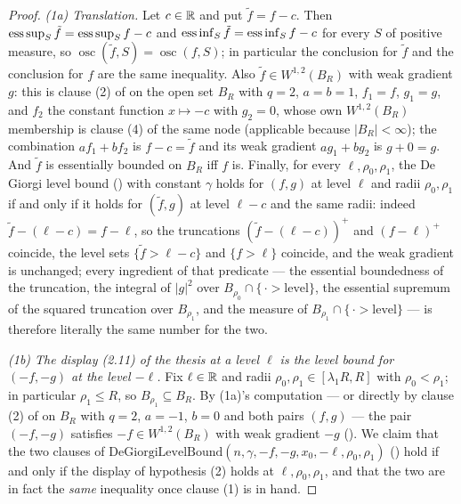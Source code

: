 \begin{proof}
\emph{(1a) Translation.}  Let $c\in\mathbb{R}$ and put $\tilde f=f-c$.  Then
$\operatorname*{ess\,sup}_S\tilde f=\operatorname*{ess\,sup}_Sf-c$ and $\operatorname*{ess\,inf}_S\tilde f=\operatorname*{ess\,inf}_Sf-c$ for every
$S$ of positive measure, so $\operatorname*{osc}(\tilde f,S)=\operatorname*{osc}(f,S)$;
in particular the conclusion for $\tilde f$ and the conclusion for $f$ are the
same inequality.  Also $\tilde f\in W^{1,2}(B_R)$ with weak gradient $g$: this is
clause (2) of  on the open set $B_R$ with $q=2$,
$a=b=1$, $f_1=f$, $g_1=g$, and $f_2$ the constant function $x\mapsto-c$ with
$g_2=0$, whose own $W^{1,2}(B_R)$ membership is clause (4) of the same node
(applicable because $|B_R|<\infty$); the combination $af_1+bf_2$ is $f-c=\tilde f$
and its weak gradient $ag_1+bg_2$ is $g+0=g$.  And $\tilde f$
is essentially bounded on $B_R$ iff $f$ is.  Finally, for every
$\ell,\rho_0,\rho_1$, the De Giorgi level bound
() with constant $\gamma$ holds for $(f,g)$ at level
$\ell$ and radii $\rho_0,\rho_1$ if and only if it holds for $(\tilde f,g)$ at
level $\ell-c$ and the same radii: indeed
$\tilde f-(\ell-c)=f-\ell$, so the truncations $(\tilde f-(\ell-c))^+$ and
$(f-\ell)^+$ coincide, the level sets
$\{\tilde f>\ell-c\}$ and $\{f>\ell\}$ coincide, and the weak gradient is
unchanged; every ingredient of that predicate --- the essential boundedness of
the truncation, the integral of $|g|^2$ over
$B_{\rho_0}\cap\{\,\cdot>\text{level}\}$, the essential supremum of the squared
truncation over $B_{\rho_1}$, and the measure of
$B_{\rho_1}\cap\{\,\cdot>\text{level}\}$ --- is therefore literally the same
number for the two.

\emph{(1b) The display (2.11) of the thesis at a level $\ell$ is the level bound for
$(-f,-g)$ at the level $-\ell$.}  Fix $\ell\in\mathbb{R}$ and radii
$\rho_0,\rho_1\in[\lambda_1R,R]$ with $\rho_0<\rho_1$; in particular
$\rho_1\le R$, so $B_{\rho_1}\subseteq B_R$.  By (1a)'s computation --- or
directly by clause (2) of  on $B_R$ with $q=2$,
$a=-1$, $b=0$ and both pairs $(f,g)$ --- the pair $(-f,-g)$ satisfies
$-f\in W^{1,2}(B_R)$ with weak gradient $-g$ ().  We claim
that the two clauses of
$\mathrm{DeGiorgiLevelBound}(n,\gamma,-f,-g,x_0,-\ell,\rho_0,\rho_1)$
() hold if and only if the display of hypothesis (2)
holds at $\ell,\rho_0,\rho_1$, and that the two are in fact the \emph{same}
inequality once clause (1) is in hand.


\end{proof}
